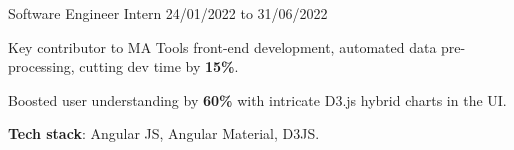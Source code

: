 \large{Software Engineer Intern} \hfill 24/01/2022 to 31/06/2022

\vspace{3pt}
\begin{resumeitemize}
    \item Key contributor to MA Tools front-end development, automated data pre-processing, cutting dev time by \textbf{15\%}.
    \item Boosted user understanding by \textbf{60\%} with intricate D3.js hybrid charts in the UI.
    \item \textbf{Tech stack}: Angular JS, Angular Material, D3JS.
\end{resumeitemize}